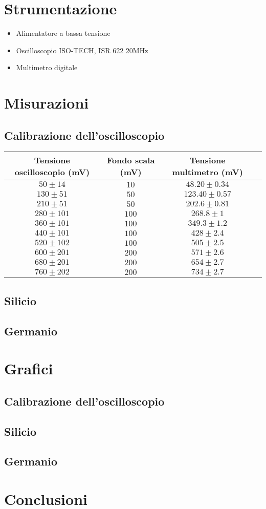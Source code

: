\documentclass[]{article}
\begin{document}
\section{Strumentazione}
\begin{itemize}
	\item Alimentatore a bassa tensione
	\item Oscilloscopio ISO-TECH, ISR 622 20MHz
	\item Multimetro digitale
\end{itemize}
\section{Misurazioni}
\subsection{Calibrazione dell'oscilloscopio}
\begin{center}
	\begin{tabular}{|c|c|c|c|}
		\hline
		Tensione oscilloscopio (mV)& Fondo scala (mV) & Tensione multimetro (mV) \\
		\hline
		$ 50\pm 14 $ &$ 10 $ & $ 48.20\pm 0.34 $ \\
		\hline
		$ 130\pm51 $ &$ 50 $ & $ 123.40\pm 0.57 $ \\
		\hline
		$ 210\pm 51 $ &$ 50 $ & $ 202.6\pm 0.81 $ \\
		\hline
		$ 280\pm 101 $ &$ 100 $ & $ 268.8\pm 1 $ \\
		\hline
		$ 360\pm 101 $ &$ 100 $ & $ 349.3\pm 1.2 $ \\
		\hline
		$ 440\pm 101 $ &$ 100 $ & $ 428\pm 2.4 $ \\
		\hline
		$ 520\pm 102 $ &$ 100 $ & $ 505\pm 2.5 $ \\
		\hline
		$ 600\pm 201 $ &$ 200 $ & $ 571\pm 2.6 $ \\
		\hline
		$ 680\pm 201 $ &$ 200 $ & $ 654\pm 2.7 $ \\
		\hline
		$ 760\pm 202 $ &$ 200 $ & $ 734\pm 2.7 $ \\
		\hline
	\end{tabular}
\end{center}
\subsection{Silicio}
\subsection{Germanio}
\section{Grafici}
\subsection{Calibrazione dell'oscilloscopio}
\subsection{Silicio}
\subsection{Germanio}
\section*{Conclusioni}
\end{document}
